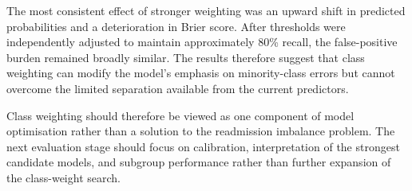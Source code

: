 \documentclass[11pt,a4paper]{article}
\begin{document}
The most consistent effect of stronger weighting was an upward shift in predicted probabilities and a deterioration in Brier score. After thresholds were independently adjusted to maintain approximately 80\% recall, the false-positive burden remained broadly similar. The results therefore suggest that class weighting can modify the model's emphasis on minority-class errors but cannot overcome the limited separation available from the current predictors.

Class weighting should therefore be viewed as one component of model optimisation rather than a solution to the readmission imbalance problem. The next evaluation stage should focus on calibration, interpretation of the strongest candidate models, and subgroup performance rather than further expansion of the class-weight search.
\end{document}
